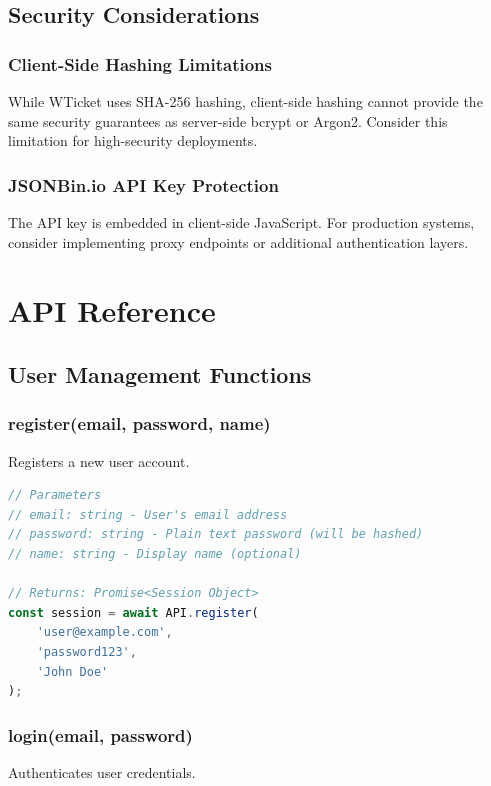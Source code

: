 \documentclass[12pt,a4paper]{report}
\begin{document}
\section{Security Considerations}
\label{sec:sec-considerations}

\subsection{Client-Side Hashing Limitations}
While WTicket uses SHA-256 hashing, client-side hashing cannot provide the same security guarantees as server-side bcrypt or Argon2. Consider this limitation for high-security deployments.

\subsection{JSONBin.io API Key Protection}
The API key is embedded in client-side JavaScript. For production systems, consider implementing proxy endpoints or additional authentication layers.

\cleardoublepage

\chapter{API Reference}
\thispagestyle{fancy}
\label{chap:api}

\section{User Management Functions}
\label{sec:user-api}

\subsection{register(email, password, name)}
Registers a new user account.

\begin{lstlisting}[language=JavaScript, caption={User Registration}, label={lst:register}]
// Parameters
// email: string - User's email address
// password: string - Plain text password (will be hashed)
// name: string - Display name (optional)

// Returns: Promise<Session Object>
const session = await API.register(
    'user@example.com',
    'password123',
    'John Doe'
);
\end{lstlisting}

\subsection{login(email, password)}
Authenticates user credentials.
\end{document}

